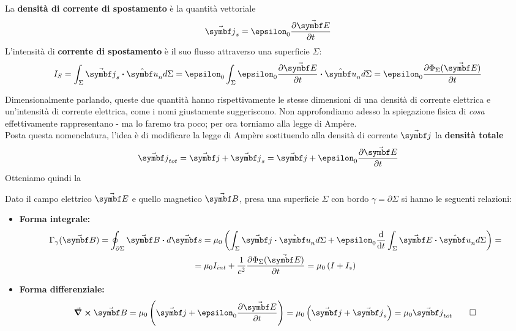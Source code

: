 \begin{define}
	La \textbf{densità di corrente di spostamento} è la quantità vettoriale
	\begin{equation}
		\vba{j}_s=\epsilon_0\pdv{\vba{E}}{t}
	\end{equation}
	L'intensità di \textbf{corrente di spostamento} è il suo flusso attraverso una superficie $\Sigma$:
	\begin{equation}
		I_S=\int_{\Sigma}\vba{j}_s\vdot \vbh{u}_nd\Sigma=\epsilon_0\int_{\Sigma}\epsilon_0\pdv{\vba{E}}{t}\vdot \vbh{u}_nd\Sigma=\epsilon_0\pdv{\Phi_{\Sigma}(\vba{E})}{t}
	\end{equation}
\end{define}
Dimensionalmente parlando, queste due quantità hanno rispettivamente le stesse dimensioni di una densità di corrente elettrica e un'intensità di corrente elettrica, come i nomi giustamente suggeriscono. Non approfondiamo adesso la spiegazione fisica di \textit{cosa} effettivamente rappresentano   - ma lo faremo tra poco; per ora torniamo alla legge di Ampère.\\
Posta questa nomenclatura, l'idea è di modificare la legge di Ampère sostituendo alla densità di corrente $\vba{j}$ la \textbf{densità totale}
\begin{equation*}
	\vba{j}_{tot}=\vba{j}+\vba{j}_s=\vba{j}+\epsilon_0\pdv{\vba{E}}{t}
\end{equation*}
Otteniamo quindi la
\begin{theorema}
	Dato il campo elettrico $\vba{E}$ e quello magnetico $\vba{B}$, presa una superficie $\Sigma$ con bordo $\gamma=\partial \Sigma$ si hanno le seguenti relazioni:
	\begin{itemize}
		\item \textbf{Forma integrale:}
		\begin{multline}
			\Gamma_{\gamma}(\vba{B})=\oint_{\partial \Sigma} \vba{B}\vdot d\vba{s}=\mu_0\left(\int_{\Sigma}\vba{j}\vdot\vbh{u}_n d\Sigma+\epsilon_0\dv{t}\int_{\Sigma}\vba{E}\vdot\vbh{u}_nd\Sigma\right)=\\
			=\mu_0 I_{int}+\frac{1}{c^2}\pdv{\Phi_{\Sigma}(\vba{E})}{t}=\mu_0\left(I+I_s\right)\label{LeggeAmpereIntegrale}
		\end{multline}
		\item \textbf{Forma differenziale:}
		\begin{equation}
			\curl{\vba{B}}=\mu_0\left(\vba{j}+\epsilon_0\pdv{\vba{E}}{t}\right)=\mu_0\left(\vba{j}+\vba{j}_s\right)=\mu_0\vba{j}_{tot}\label{LeggeAmpereDifferenziale}\qedhere
		\end{equation}
	\end{itemize}
\end{theorema}
